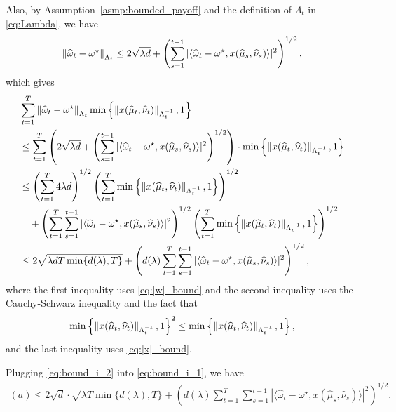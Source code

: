 Also, by Assumption~\ref{asmp:bounded_payoff} and the definition of $\Lambda_t$ in \eqref{eq:Lambda}, we have
\begin{align}\label{eq:|w|_bound}
    \left\| \widehat{\omega}_t-\omega^\star \right\|_{\Lambda_t}\leq 2\sqrt{\lambda d}+\left(\sum_{s=1}^{t-1} |\langle \widehat{\omega}_t-\omega^\star,x(\widehat{\mu}_s,\widehat{\nu}_s)\rangle|^2\right)^{1/2},
\end{align}
which gives
\begin{align}\label{eq:bound_i_2}
    & \sum_{t=1}^T \left\| \widehat{\omega}_t-\omega^\star \right\|_{\Lambda_t}\min\left\{ \left\| x(\widehat{\mu}_t,\widehat{\nu}_t) \right\|_{\Lambda_{t}^{-1}},1\right\}\notag\\
    &\leq \sum_{t=1}^T\left(2\sqrt{\lambda d} +\left(\sum_{s=1}^{t-1} |\langle \widehat{\omega}_t-\omega^\star,x(\widehat{\mu}_s,\widehat{\nu}_s)\rangle|^2\right)^{1/2}\right)\cdot\min\left\{ \left\| x(\widehat{\mu}_t,\widehat{\nu}_t) \right\|_{\Lambda_{t}^{-1}},1\right\}\notag\\
    &\leq \left(\sum_{t=1}^T 4\lambda d\right)^{1/2}
    \left(\sum_{t=1}^T \min\left\{ \left\| x(\widehat{\mu}_t,\widehat{\nu}_t) \right\|_{\Lambda_{t}^{-1}},1\right\}\right)^{1/2}\notag\\
    &\quad + \left(\sum_{t=1}^T \sum_{s=1}^{t-1} |\langle \widehat{\omega}_t-\omega^\star,x(\widehat{\mu}_s,\widehat{\nu}_s)\rangle|^2\right)^{1/2}\left(\sum_{t=1}^T \min\left\{ \left\| x(\widehat{\mu}_t,\widehat{\nu}_t) \right\|_{\Lambda_{t}^{-1}},1\right\}\right)^{1/2}\notag\\
    &\leq 2\sqrt{\lambda dT \min\{d(\lambda),T\}} + \left(d(\lambda)\sum_{t=1}^T \sum_{s=1}^{t-1} |\langle \widehat{\omega}_t-\omega^\star,x(\widehat{\mu}_s,\widehat{\nu}_s)\rangle|^2\right)^{1/2},
\end{align}
where the first inequality uses \eqref{eq:|w|_bound} and the second inequality uses the Cauchy-Schwarz inequality and the fact that 
$$\min\left\{ \left\| x(\widehat{\mu}_t,\widehat{\nu}_t) \right\|_{\Lambda_{t}^{-1}},1\right\}^2\leq \min\left\{ \left\| x(\widehat{\mu}_t,\widehat{\nu}_t) \right\|_{\Lambda_{t}^{-1}},1\right\},$$
and the last inequality uses \eqref{eq:|x|_bound}.

Plugging \eqref{eq:bound_i_2} into \eqref{eq:bound_i_1}, we have
\begin{align}\label{eq:bound_i_lm}
    (a)\leq 2\sqrt{d}\cdot\sqrt{\lambda T \min\{d(\lambda),T\}} + \left(d(\lambda)\sum_{t=1}^T \sum_{s=1}^{t-1} |\langle \widehat{\omega}_t-\omega^\star,x(\widehat{\mu}_s,\widehat{\nu}_s)\rangle|^2\right)^{1/2}.
\end{align}



